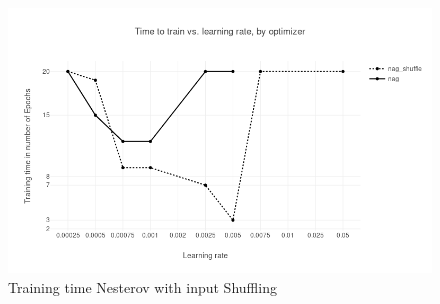 \begin{figure}[h]
\centering
\includegraphics[scale=0.3]{images/results_nag_shuffle}
\caption{Training time Nesterov with input Shuffling}
\label{fig:results_nag}
\end{figure}

